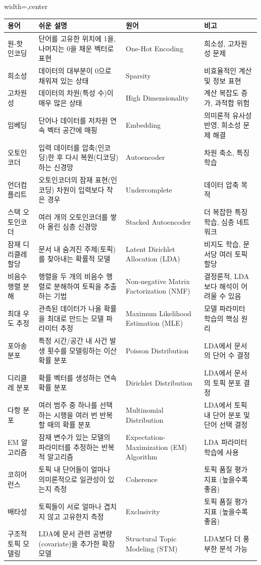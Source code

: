 \documentclass[11pt,a4paper]{article}
\begin{document}
\begin{adjustbox}{width=\textwidth,center}
\begin{tabular}{llll}
\toprule
\textbf{용어} & \textbf{쉬운 설명} & \textbf{원어} & \textbf{비고} \\
\midrule
원-핫 인코딩 & 단어를 고유한 위치에 1을, 나머지는 0을 채운 벡터로 표현 & One-Hot Encoding & 희소성, 고차원성 문제 \\
희소성 & 데이터의 대부분이 0으로 채워져 있는 상태 & Sparsity & 비효율적인 계산 및 정보 표현 \\
고차원성 & 데이터의 차원(특성 수)이 매우 많은 상태 & High Dimensionality & 계산 복잡도 증가, 과적합 위험 \\
임베딩 & 단어나 데이터를 저차원 연속 벡터 공간에 매핑 & Embedding & 의미론적 유사성 반영, 희소성 문제 해결 \\
오토인코더 & 입력 데이터를 압축(인코딩)한 후 다시 복원(디코딩)하는 신경망 & Autoencoder & 차원 축소, 특징 학습 \\
언더컴플리트 & 오토인코더의 잠재 표현(인코딩) 차원이 입력보다 작은 경우 & Undercomplete & 데이터 압축 목적 \\
스택 오토인코더 & 여러 개의 오토인코더를 쌓아 올린 심층 신경망 & Stacked Autoencoder & 더 복잡한 특징 학습, 심층 네트워크 \\
잠재 디리클레 할당 & 문서 내 숨겨진 주제(토픽)를 찾아내는 확률적 모델 & Latent Dirichlet Allocation (LDA) & 비지도 학습, 문서당 여러 토픽 할당 \\
비음수 행렬 분해 & 행렬을 두 개의 비음수 행렬로 분해하여 토픽을 추출하는 기법 & Non-negative Matrix Factorization (NMF) & 결정론적, LDA보다 해석이 어려울 수 있음 \\
최대 우도 추정 & 관측된 데이터가 나올 확률을 최대로 만드는 모델 파라미터 추정 & Maximum Likelihood Estimation (MLE) & 모델 파라미터 학습의 핵심 원리 \\
포아송 분포 & 특정 시간/공간 내 사건 발생 횟수를 모델링하는 이산 확률 분포 & Poisson Distribution & LDA에서 문서의 단어 수 결정 \\
디리클레 분포 & 확률 벡터를 생성하는 연속 확률 분포 & Dirichlet Distribution & LDA에서 문서의 토픽 분포 결정 \\
다항 분포 & 여러 범주 중 하나를 선택하는 시행을 여러 번 반복할 때의 확률 분포 & Multinomial Distribution & LDA에서 토픽 내 단어 분포 및 단어 선택 결정 \\
EM 알고리즘 & 잠재 변수가 있는 모델의 파라미터를 추정하는 반복적 알고리즘 & Expectation-Maximization (EM) Algorithm & LDA 파라미터 학습에 사용 \\
코히어런스 & 토픽 내 단어들이 얼마나 의미론적으로 일관성이 있는지 측정 & Coherence & 토픽 품질 평가 지표 (높을수록 좋음) \\
배타성 & 토픽들이 서로 얼마나 겹치지 않고 고유한지 측정 & Exclusivity & 토픽 품질 평가 지표 (높을수록 좋음) \\
구조적 토픽 모델링 & LDA에 문서 관련 공변량(covariate)을 추가한 확장 모델 & Structural Topic Modeling (STM) & LDA보다 더 풍부한 분석 가능 \\
\bottomrule
\end{tabular}
\end{adjustbox}
\end{document}
